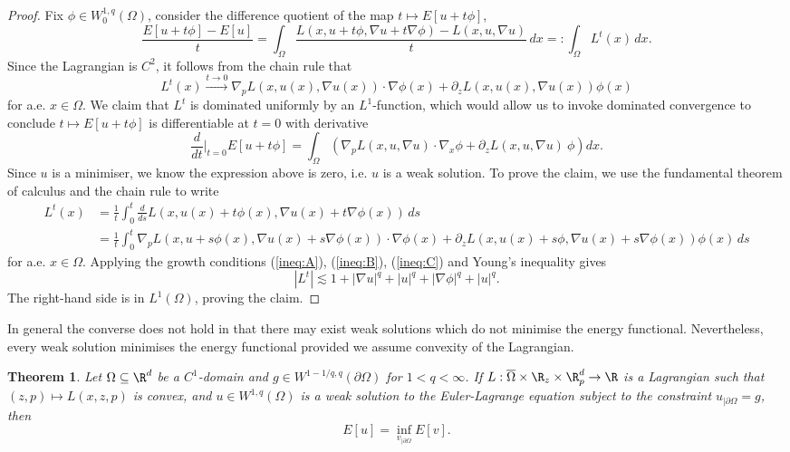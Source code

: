 \documentclass[reqno]{amsart}
\newtheorem{theorem}{Theorem}
\theoremstyle{definition}
\theoremstyle{remark}
\begin{document}
\begin{proof}
	Fix $\phi \in W^{1, q}_0 (\Omega)$, consider the difference quotient of the map $t \mapsto E[u + t \phi]$,
		\[ \frac{E[u + t \phi] - E[u]}{t} = \int_\Omega \frac{L(x, u + t \phi, \nabla u + t \nabla \phi) - L(x, u, \nabla u)}{t} \, dx =: \int_\Omega L^t (x) \, dx. \]
	Since the Lagrangian is $C^2$, it follows from the chain rule that
		\[ L^t(x) \overset{t \to 0}{\longrightarrow} \nabla _p L(x, u(x), \nabla u(x)) \cdot \nabla \phi(x) + \partial_z L(x, u(x), \nabla u(x)) \phi(x) \]
	for a.e. $x \in \Omega$. We claim that $L^t$ is dominated uniformly by an $L^1$-function, which would allow us to invoke dominated convergence to conclude $t \mapsto E[u + t \phi]$ is differentiable at $t = 0$ with derivative
		\[ \frac{d}{dt} \Big|_{t = 0} E[u + t \phi] = \int_\Omega \left(\nabla_p L (x, u, \nabla u) \cdot \nabla_x \phi + \partial_z L (x, u, \nabla u) \ \phi\right) dx . \]
	Since $u$ is a minimiser, we know the expression above is zero, i.e. $u$ is a weak solution. To prove the claim, we use the fundamental theorem of calculus and the chain rule to write
		\begin{align*}
			 L^t (x) 
			 	&= \frac1t \int_0^t \frac{d}{ds} L(x, u(x) + t \phi(x), \nabla u(x) + t \nabla \phi(x)) \, ds \\
			 	&= \frac1t \int_0^t \nabla_p L (x, u + s \phi(x), \nabla u(x) + s \nabla \phi (x)) \cdot \nabla \phi(x) + \partial_z L(x, u(x) + s \phi, \nabla u(x) + s \nabla \phi(x)) \phi (x) \, ds
		\end{align*} 	
	for a.e. $x \in \Omega$. Applying the growth conditions (\ref{ineq:A}), (\ref{ineq:B}), (\ref{ineq:C}) and Young's inequality gives
		\[ |L^t| \lesssim 1 + |\nabla u|^q + |u|^q + |\nabla \phi|^q + |u|^q. \]
	The right-hand side is in $L^1 (\Omega)$, proving the claim. 	
\end{proof}

In general the converse does not hold in that there may exist weak solutions which do not minimise the energy functional. Nevertheless, every weak solution minimises the energy functional provided we assume convexity of the Lagrangian. 

\begin{theorem}
	Let $\Omega \subseteq \R^d$ be a $C^1$-domain and $g \in W^{1 - 1/q, q} (\partial \Omega)$ for $1 < q < \infty$. If $L : \overline \Omega \times \R_z \times \R_p^d \to \R$ is a Lagrangian such that $(z, p) \mapsto L(x, z, p)$ is convex, and $u \in W^{1, q} (\Omega)$ is a weak solution to the Euler-Lagrange equation subject to the constraint $u_{|\partial \Omega} = g$, then
		\[ E[u] = \inf_{v_{|\partial \Omega}} E[v]. \]
\end{theorem}
\end{document}
